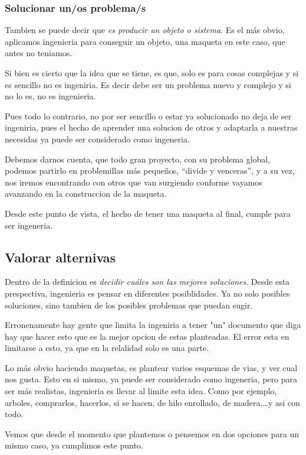 \subsubsection{Solucionar un/os problema/s}
Tambien se puede decir que \textit{es producir un objeto o sistema}. Es el más obvio, aplicamos
ingenieria para conseguir un objeto, una maqueta en este caso, que antes no teniamos.

Si bien es cierto que la idea que se tiene, es que, solo es para cosas complejas y si es
sencillo no es ingeniria. Es decir debe ser un problema nuevo y complejo y si no lo es,
no es ingenieria.

Pues todo lo contrario, no por ser sencillo o estar ya solucionado no deja de ser ingeniria,
pues el hecho de aprender una solucion de otros y adaptarla a nuestras necesidas ya puede
ser considerado como ingeneria.

Debemos darnos cuenta, que todo gran proyecto, con su problema global, podemos partirlo en
problemillas más pequeños, ``divide y venceras'', y a su vez, nos iremos encontrando con otros
que van surgiendo conforme vayamos avanzando en la construccion de la maqueta.

Desde este punto de vista, el hecho de tener una maqueta al final, cumple para ser ingeneria.

\subsection{Valorar alternivas}
Dentro de la definicion es \textit{decidir cuáles son las mejores soluciones}. Desde esta
prespectiva, ingenieria es pensar en diferentes posiblidades. Ya no solo posibles soluciones,
sino tambien de los posibles problemas que puedan sugir.

Erronenamente hay gente que limita la ingeniria a tener "un" documento que diga hay que hacer
esto que es la mejor opcion de estas planteadas. El error esta en limitarse a esto, ya que en
la relalidad solo es una parte.

Lo más obvio haciendo maquetas, es plantear varios esquemas de vias, y ver cual nos gusta.
Esto en si mismo, ya puede ser considerado como ingeneria, pero para ser más realistas,
ingenieria es llevar al limite esta idea. Como por ejemplo, arboles, comprarlos, hacerlos, si
se hacen, de hilo enrollado, de madera,\dots y asi con todo.

Vemos que desde el momento que plantemos o pensemos en dos opciones para un mismo caso, ya
cumplimos este punto.

